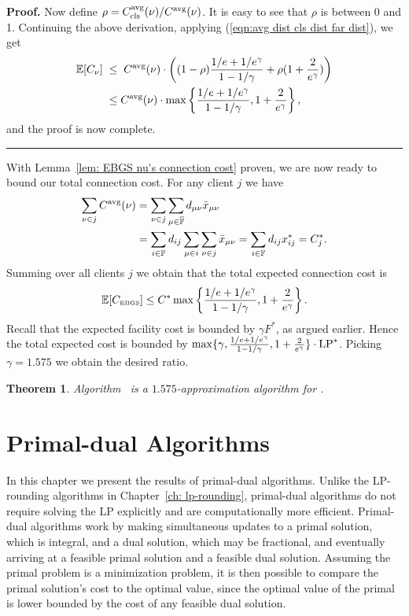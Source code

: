 \documentclass[oneside,final]{ucr}
\newtheorem{theorem}{Theorem}
\newenvironment{proof}[1][Proof]{\textbf{#1.} }{\ \rule{0.5em}{0.5em}}
\begin{document}
\begin{proof}
Now define $\rho =C_{{\mbox{\scriptsize\rm cls}}}^{{\mbox{\scriptsize\rm avg}}}(\nu)/C^{{\mbox{\scriptsize\rm avg}}}(\nu)$. It is easy to
see that $\rho$ is between 0 and 1. Continuing the above
derivation, applying (\ref{eqn:avg dist cls dist far dist}), we get
%
\begin{align*}
\mathbb{E}[C_{\nu}]
             \;&\le\; C^{{\mbox{\scriptsize\rm avg}}}(\nu) 
			\cdot\left((1-\rho)\frac{1/e+1/e^\gamma}{1-1/\gamma} 
				+ \rho (1 + \frac{2}{e^\gamma})\right)
			\\
             &\leq C^{{\mbox{\scriptsize\rm avg}}}(\nu) 
				\cdot \max\left\{\frac{1/e+1/e^\gamma}{1-1/\gamma}, 1 + \frac{2}{e^\gamma}\right\},
\end{align*}
%
and the proof is now complete.
\end{proof}

With Lemma~\ref{lem: EBGS nu's connection cost} proven, we are now ready to bound our total connection cost.
For any client $j$ we have
%
\begin{align*}
\sum_{\nu\in j} C^{{\mbox{\scriptsize\rm avg}}}(\nu)
	&= \sum_{\nu\in j}\sum_{\mu\in\overline{\mathbb{F}}} d_{\mu\nu}{\bar x}_{\mu\nu} 
	\\
	&= \sum_{i\in\mathbb{F}}d_{ij}\sum_{\mu\in i}\sum_{\nu\in j} {\bar x}_{\mu\nu}
	= \sum_{i\in\mathbb{F}} d_{ij}x_{ij}^\ast = C_j^\ast.
\end{align*}
% 
Summing over all clients $j$ we obtain that the total expected connection cost is
%
\begin{equation*}
	\mathbb{E}[ C_{\mbox{\tiny\rm EBGS}} ] \le  C^\ast\max\left\{\frac{1/e+1/e^\gamma}{1-1/\gamma}, 1+\frac{2}{e^\gamma}\right\}.
\end{equation*}
%
Recall that the expected facility cost is bounded by $\gamma F^\ast$,
as argued earlier. Hence the total expected cost is bounded by $\max\{\gamma,
\frac{1/e+1/e^\gamma}{1-1/\gamma}, 1+\frac{2}{e^\gamma}\}\cdot
\mbox{\rm LP}^\ast$. Picking $\gamma=1.575$ we obtain the desired ratio.


\begin{theorem}\label{thm:ebgs}
  Algorithm~{\EBGS} is a $1.575$-approximation algorithm for \FTFP.
\end{theorem}

\chapter{Primal-dual Algorithms} 
\label{ch: primal-dual} 

In this chapter we present the results of primal-dual
algorithms. Unlike the LP-rounding algorithms in
Chapter~\ref{ch: lp-rounding}, primal-dual algorithms do not
require solving the LP explicitly and are computationally
more efficient. Primal-dual algorithms work by making
simultaneous updates to a primal solution, which is
integral, and a dual solution, which may be fractional, and
eventually arriving at a feasible primal solution and a
feasible dual solution. Assuming the primal problem is a
minimization problem, it is then possible to compare the
primal solution's cost to the optimal value, since the
optimal value of the primal is lower bounded by the cost of
any feasible dual solution.
\end{document}
